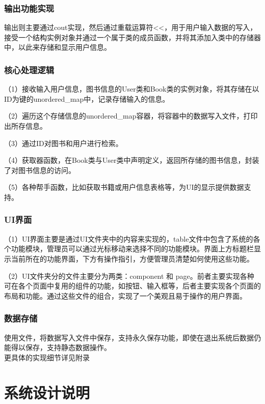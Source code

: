 \documentclass{article}
\begin{document}
\subsubsection{输出功能实现}
输出则主要通过cout实现，然后通过重载运算符\textless{}\textless{}，用于用户输入数据的写入，接受一个结构实例对象并通过一个属于类的成员函数，并将其添加入类中的存储器中，以此来存储和显示用户信息。\\
\subsubsection{核心处理逻辑}
（1）接收输入用户信息，图书信息的User类和Book类的实例对象，将其存储在以ID为键的unordered\_map中，记录存储输入的信息。

（2）遍历这个存储信息的unordered\_map容器，将容器中的数据写入文件，打印出所存信息。

（3）通过ID对图书和用户进行检索。

（4）获取器函数，在Book类与User类中声明定义，返回所存储的图书信息，封装了对图书信息的访问。

（5）各种帮手函数，比如获取书籍或用户信息表格等，为UI的显示提供数据支持。
\subsubsection{UI界面}

（1）UI界面主要是通过UI文件夹中的内容来实现的，table文件中包含了系统的各个功能模块，管理员可以通过光标移动来选择不同的功能模块。界面上方标题栏显示当前所在的功能界面，下方有操作指引，方便管理员清楚如何使用这些功能。

（2）UI文件夹分的文件主要分为两类：component 和 page。前者主要实现各种可在各个页面中复用的组件的功能，如按钮、输入框等，后者主要实现各个页面的布局和功能。通过这些文件的组合，实现了一个美观且易于操作的用户界面。
\subsubsection{数据存储}

使用文件，将数据写入文件中保存，支持永久保存功能，即使在退出系统后数据仍能得以保存，支持静态数据操作。\\

更具体的实现细节详见附录

\section{系统设计说明}
\end{document}
